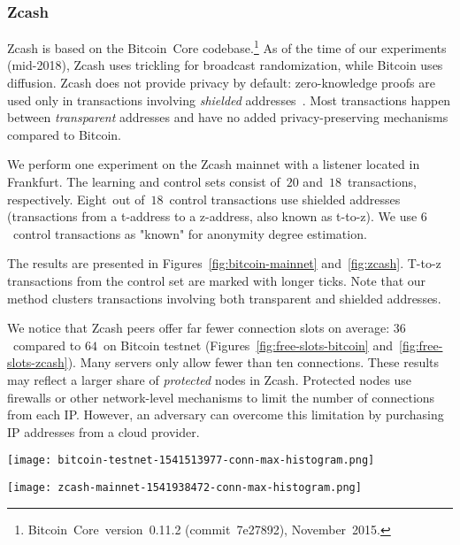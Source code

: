 \subsubsection{Zcash}

Zcash is based on the Bitcoin~Core codebase.\footnote{Bitcoin~Core~version~0.11.2 (commit~7e27892), November~2015.}
As of the time of our experiments (mid-2018), Zcash uses trickling for broadcast randomization, while Bitcoin uses diffusion.
Zcash does not provide privacy by default: zero-knowledge proofs are used only in transactions involving \textit{shielded} addresses~\cite{Kappos2018}.
Most transactions happen between \textit{transparent} addresses and have no added privacy-preserving mechanisms compared to Bitcoin.

We perform one experiment on the Zcash mainnet with a listener located in Frankfurt.
The learning and control sets consist of~$20$ and~$18$~transactions, respectively.
Eight~out of~$18$~control transactions use shielded addresses (transactions from a t-address to a z-address, also known as t-to-z).
We use $6$~control transactions as "known" for anonymity degree estimation.

The results are presented in Figures~\ref{fig:bitcoin-mainnet} and~\ref{fig:zcash}.
T-to-z transactions from the control set are marked with longer ticks.
Note that our method clusters transactions involving both transparent and shielded addresses.

We notice that Zcash peers offer far fewer connection slots on average: $36$~compared to $64$~on Bitcoin testnet (Figures~\ref{fig:free-slots-bitcoin} and~\ref{fig:free-slots-zcash}).
Many servers only allow fewer than ten connections.
These results may reflect a larger share of \textit{protected} nodes in Zcash.
Protected nodes use firewalls or other network-level mechanisms to limit the number of connections from each IP\@.
However, an adversary can overcome this limitation by purchasing IP addresses from a cloud provider.

\begin{figure*}
	\centering
	\begin{minipage}{0.5\textwidth}
		\centering
		\texttt{[image: bitcoin-testnet-1541513977-conn-max-histogram.png]}
		\caption{Free connection slots for Bitcoin testnet.}
		\label{fig:free-slots-bitcoin}
	\end{minipage}\hfill
	\begin{minipage}{0.5\textwidth}
		\centering
		\texttt{[image: zcash-mainnet-1541938472-conn-max-histogram.png]}
		\caption{Free connection slots for Zcash mainnet.}
		\label{fig:free-slots-zcash}
	\end{minipage}\hfill
\end{figure*}



